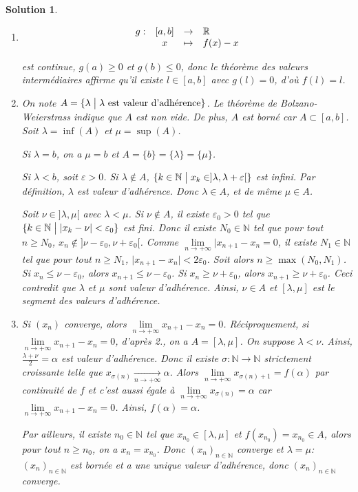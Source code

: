 \documentclass[12pt]{article}
\newtheorem{solution}{Solution}[section]
\theoremstyle{remark}
\newcommand{\N}{\mathbb{N}} \newcommand{\Z}{\mathbb{Z}}
\newcommand{\function}[5]{
	$$
	\begin{array}{rccl}
		#1: & #2 & \to & #3 \\
		& #4 & \mapsto & #5
	\end{array}
	$$
}
\numberwithin{equation}{section}
\begin{document}
\begin{solution}
	\phantom{}
	\begin{enumerate}
		\item \function{g}{[a,b]}{\R}{x}{f(x)-x}
		est continue, $g(a)\geqslant0$ et $g(b)\leqslant0$, donc le théorème des valeurs intermédiaires affirme qu'il existe $l\in[a,b]$ avec $g(l)=0$, d'où $f(l)=l$.

		\item On note $A=\{\lambda\bigm| \lambda\text{ est valeur d'adhérence}\}$.
		Le théorème de Bolzano-Weierstrass indique que $A$ est non vide. De plus, $A$ est borné car $A\subset[a,b]$. Soit $\lambda=\inf(A)$ et $\mu=\sup(A)$. 
		
		Si $\lambda=b$, on a $\mu=b$ et $A=\{b\}=\{\lambda\}=\{\mu\}$.

		Si $\lambda<b$, soit $\varepsilon>0$. Si $\lambda\notin A$, $\{k\in\N\bigm| x_{k}\in]\lambda,\lambda+\varepsilon[\}$ est infini. Par définition, $\lambda$ est valeur d'adhérence. Donc $\lambda\in A$, et de même $\mu\in A$.

		Soit $\nu\in]\lambda,\mu[$ avec $\lambda<\mu$. Si $\nu\notin A$, il existe $\varepsilon_{0}>0$ tel que $\{k\in\N\bigm|\vert x_{k}-\nu\vert<\varepsilon_{0}\}$ est fini. Donc il existe $N_{0}\in\N$ tel que pour tout $n\geqslant N_{0}$, $x_{n}\notin]\nu-\varepsilon_{0},\nu+\varepsilon_{0}[$. Comme $\lim\limits_{n\to+\infty}\vert x_{n+1}-x_{n}=0$, il existe $N_{1}\in\N$ tel que pour tout $n\geqslant N_{1}$, $\vert x_{n+1}-x_{n}\vert<2\varepsilon_{0}$. 
		Soit alors $n\geqslant\max(N_{0},N_{1})$. Si $x_{n}\leqslant\nu-\varepsilon_{0}$, alors $x_{n+1}\leqslant\nu-\varepsilon_{0}$. Si $x_{n}\geqslant\nu+\varepsilon_{0}$, alors $x_{n+1}\geqslant\nu+\varepsilon_{0}$. Ceci contredit que $\lambda$ et $\mu$ sont valeur d'adhérence. Ainsi, $\nu\in A$ et $[\lambda,\mu]$ est le segment des valeurs d'adhérence.

		\item Si $(x_{n})$ converge, alors $\lim\limits_{n\to+\infty}x_{n+1}-x_{n}=0$. Réciproquement, si $\lim\limits_{n\to+\infty}x_{n+1}-x_{n}=0$, d'après 2., on a $A=[\lambda,\mu]$. On suppose $\lambda<\nu$. Ainsi, $\frac{\lambda+\nu}{2}=\alpha$ est valeur d'adhérence. Donc il existe $\sigma\colon\N\to\N$ strictement croissante telle que $x_{\sigma(n)}\xrightarrow[n\to+\infty]{}\alpha$. Alors $\lim\limits_{n\to+\infty}x_{\sigma(n)+1}=f(\alpha)$ par continuité de $f$ et c'est aussi égale à $\lim\limits_{n\to+\infty}x_{\sigma(n)}=\alpha$ car $\lim\limits_{n\to+\infty}x_{n+1}-x_{n}=0$.
		Ainsi, $f(\alpha)=\alpha$.

		Par ailleurs, il existe $n_{0}\in\N$ tel que $x_{n_{0}}\in[\lambda,\mu]$ et $f(x_{n_{0}})=x_{n_{0}}\in A$, alors pour tout $n\geqslant n_{0}$, on a $x_{n}=x_{n_{0}}$. Donc $(x_{n})_{n\in\N}$ converge et $\lambda=\mu$: $(x_{n})_{n\in\N}$ est bornée et a une unique valeur d'adhérence, donc $(x_{n})_{n\in\N}$ converge.
	\end{enumerate}
\end{solution}
\end{document}
